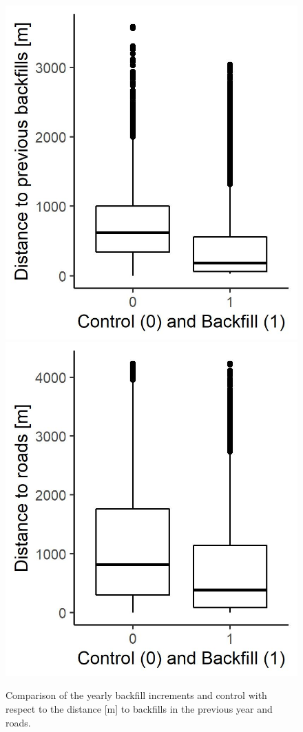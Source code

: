 \documentclass[11pt, letterpaper, oneside]{article}
\begin{document}
\begin{figure}[H]
\includegraphics[width = 7 cm]{figures/boxplot backfill logi.jpg}
\includegraphics[width = 7 cm]{figures/boxplot roads logi.jpg}
\caption{Comparison of the yearly backfill increments and control with respect to the distance [m] to backfills in the previous year and roads.}
\label{fig:logibox}
\end{figure}
\end{document}
